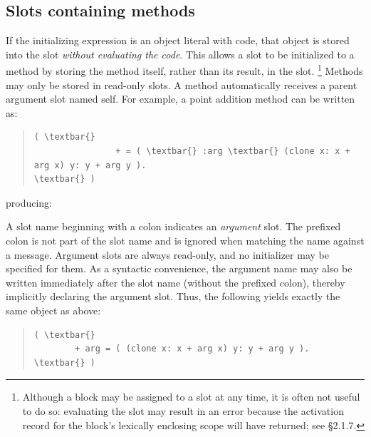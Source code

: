 \documentclass[letterpaper,10pt,english]{sphinxmanual}
\begin{document}

\subsection{Slots containing methods}
\label{langref:index-39}\label{langref:slots-containing-methods}
If the initializing expression is an object literal with code, that object is stored into the slot \emph{without evaluating the code}. This allows a slot to be initialized to a method by storing the method itself, rather than its result, in the slot. \footnote{
Although a block may be assigned to a slot at any time, it is often not useful to do so: evaluating the slot may result in an error because the activation record for the block’s lexically enclosing scope will have returned; see \S{}2.1.7.
} Methods may only be stored in read-only slots. A method automatically receives a parent argument slot named self. For example, a point addition method can be written as:
\begin{quote}

\begin{Verbatim}[commandchars=\\\{\}]
( \textbar{}
                + = ( \textbar{} :arg \textbar{} (clone x: x + arg x) y: y + arg y ).
\textbar{} )
\end{Verbatim}
\end{quote}

producing:
\begin{figure}[htbp]\begin{flushleft}

\end{flushleft}\end{figure}

A slot name beginning with a colon indicates an \emph{argument} slot. The prefixed colon is not part of the slot name and is ignored when matching the name against a message. Argument slots are always read-only, and no initializer may be specified for them. As a syntactic convenience, the argument name may also be written immediately after the slot name (without the prefixed colon), thereby implicitly declaring the argument slot. Thus, the following yields exactly the same object as above:
\begin{quote}

\begin{Verbatim}[commandchars=\\\{\}]
( \textbar{}
        + arg = ( (clone x: x + arg x) y: y + arg y ).
\textbar{} )
\end{Verbatim}
\end{quote}
\end{document}
